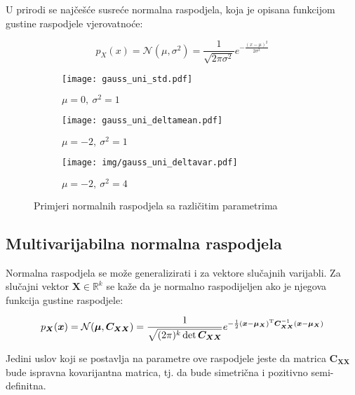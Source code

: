 \newcommand*{\vecrow}[2]{\left[\begin{array}{cc}#1&#2\end{array}\right]}
\newcommand*{\veccol}[2]{\left[\begin{array}{c}#1\\#2\end{array}\right]}

U prirodi se najčešće susreće normalna raspodjela, koja je opisana funkcijom
gustine raspodjele vjerovatnoće:

$$p_X(x) = \mathcal{N}(\mu,\sigma^2)
	= \frac{1}{\sqrt{2\pi\sigma^2}} e^{-\frac{(x-\mu)^2}{2\sigma^2}}$$

\begin{figure}[h]
  \centering
  \begin{subfigure}[b]{0.28\textwidth}
    \centering
    \texttt{[image: gauss\_uni\_std.pdf]}
    \caption{$\mu=0,\ \sigma^2=1$}
  \end{subfigure}
	\begin{subfigure}[b]{0.28\textwidth}
		\centering
    \texttt{[image: gauss\_uni\_deltamean.pdf]}
    \caption{$\mu=-2,\ \sigma^2=1$}
	\end{subfigure}
	\begin{subfigure}[b]{0.28\textwidth}
		\centering
    \texttt{[image: img/gauss\_uni\_deltavar.pdf]}
    \caption{$\mu=-2,\ \sigma^2=4$}
	\end{subfigure}
	\caption{Primjeri normalnih raspodjela sa različitim parametrima}
\end{figure}

\subsection{Multivarijabilna normalna raspodjela}

Normalna raspodjela se može generalizirati i za vektore slučajnih varijabli.
Za slučajni vektor $\bm X \in \mathbb{R}^k$ se kaže da je normalno
raspodijeljen ako je njegova funkcija gustine raspodjele:

$$p_{\bm X}(\bm x) = \mathcal{N}(\bm\mu,\bm C_{\bm X\bm X}) =
	\frac{1}{\sqrt{(2\pi)^k \det \bm C_{\bm X \bm X}}}
	e^{
		-\frac{1}{2}(\bm x - \bm\mu_{\bm X})^\text T
		\bm C_{\bm X \bm X}^{-1}
		(\bm x - \bm\mu_{\bm X})
 	 }$$

Jedini uslov koji se postavlja na parametre ove raspodjele jeste da matrica
$\bm C_{\bm X\bm X}$ bude ispravna kovarijantna matrica, tj. da bude simetrična
i pozitivno semi-definitna.

